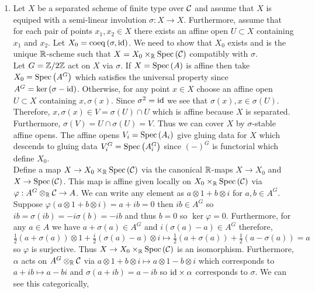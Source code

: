 \documentclass[12pt]{article}
\begin{document}
\begin{enumerate}
\item Let $X$ be a separated scheme of finite type over $\mathcal{C}$ and assume that $X$ is equiped with a semi-linear involution $\sigma : X \to X$. Furthermore, assume that for each pair of points $x_1, x_2 \in X$ there exists an affine open $U \subset X$ containing $x_1$ and $x_2$. Let $X_0 = \operatorname{\mathrm{coeq}}{(\sigma, \mathrm{id})}$. We need to show that $X_0$ exists and is the unique $\mathbb{R}$-scheme such that $X = X_0 \times_{\mathbb{R}} \mathrm{Spec}\left( \mathcal{C} \right)$ compatibly with $\sigma$.
\bigskip\\
Let $G = \mathbb{Z}/2\mathbb{Z}$ act on $X$ via $\sigma$. If $X = \mathrm{Spec}\left( A \right)$ is affine then take $X_0 = \mathrm{Spec}\left( A^G \right)$ which satisfies the universal property since $A^G = \ker{(\sigma - \mathrm{id})}$. Otherwise, for any point $x \in X$ choose an affine open $U \subset X$ containing $x, \sigma(x)$. Since $\sigma^2 = \mathrm{id}$ we see that $\sigma(x), x \in \sigma(U)$. Therefore, $x, \sigma(x) \in V = \sigma(U) \cap U$ which is affine because $X$ is separated. Furthermore, $\sigma(V) = U \cap \sigma(U) = V$. Thus we can cover $X$ by $\sigma$-stable affine opens. The affine opens $V_i = \mathrm{Spec}\left( A_i \right)$ give gluing data for $X$ which descends to gluing data $V_i^G = \mathrm{Spec}\left( A^G_i \right)$ since $(-)^G$ is functorial which define $X_0$.
\bigskip\\
Define a map $X \to X_0 \times_{\mathbb{R}} \mathrm{Spec}\left( \mathcal{C} \right)$ via the canonical $\mathbb{R}$-maps $X \to X_0$ and $X \to \mathrm{Spec}\left( \mathcal{C} \right)$. This map is affine given locally on $X_0 \times_{\mathbb{R}} \mathrm{Spec}\left( \mathcal{C} \right)$ via $\varphi : A^G \otimes_{\mathbb{R}} \mathcal{C} \to A$. We can write any element as $a \otimes 1 + b \otimes i$ for $a,b \in A^G$. Suppose $\varphi(a \otimes 1 + b \otimes i) = a + i b = 0$ then $i b \in A^G$ so $i b = \sigma(ib) = -i \sigma(b) = -i b$ and thus $b = 0$ so $\ker{\varphi} = 0$. Furthermore, for any $a \in A$ we have $a + \sigma(a) \in A^G$ and $i (\sigma(a) - a)  \in A^G$ therefore,
\[ \tfrac{1}{2} (a + \sigma(a)) \otimes 1 + \tfrac{i}{2} (\sigma(a) - a) \otimes i \mapsto \tfrac{1}{2} (a + \sigma(a)) + \tfrac{1}{2}(a - \sigma(a)) = a \]
so $\varphi$ is surjective. Thus $X \to X_0 \times_{\mathbb{R}} \mathrm{Spec}\left( \mathcal{C} \right)$ is an isomorphism. Furthermore, $\alpha$ acts on $A^G \otimes_{\mathbb{R}} \mathcal{C}$ via $a \otimes 1 + b \otimes i \mapsto a \otimes 1 - b \otimes i$ which corresponds to $a + ib \mapsto a - bi$ and $\sigma(a + ib) = a - ib$ so $\mathrm{id} \times \alpha$ corresponds to $\sigma$. We can see this categorically,
\begin{center}
\end{center}
\end{enumerate}
\end{document}
